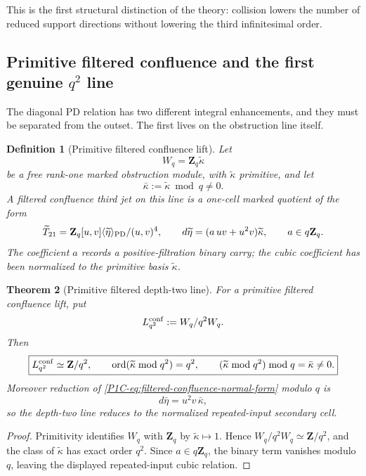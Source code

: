 \documentclass[11pt]{article}
\newtheorem{theorem}{Theorem}[section]
\newtheorem{definition}[theorem]{Definition}
\theoremstyle{remark}
\newcommand{\Z}{\mathbf Z}
\providecommand{\Ord}{\operatorname{Ord}}
\renewcommand{\Ord}{\operatorname{ord}}
\begin{document}
This is the first structural distinction of the theory: collision lowers the number of reduced support directions without lowering the third infinitesimal order.

\subsection{Primitive filtered confluence and the first genuine $q^2$ line}

The diagonal PD relation has two different integral enhancements, and they must be separated from the outset.  The first lives on the obstruction line itself.

\begin{definition}[Primitive filtered confluence lift]\label{P1C-def:filtered-confluence-lift}
Let
\[
 W_q=\Z_q\widetilde\kappa
\]
be a free rank-one marked obstruction module, with $\widetilde\kappa$ primitive, and let
\[
 \bar\kappa:=\widetilde\kappa\bmod q\ne0.
\]
A \emph{filtered confluence third jet} on this line is a one-cell marked quotient of the form
\begin{equation}\label{P1C-eq:filtered-confluence-normal-form}
 \widetilde T_{21}
 =
 \Z_q[u,v]\langle\widetilde\eta\rangle_{\rm PD}/(u,v)^4,
 \qquad
 d\widetilde\eta=(a\,uv+u^2v)\widetilde\kappa,
 \qquad a\in q\Z_q.
\end{equation}
The coefficient $a$ records a positive-filtration binary carry; the cubic coefficient has been normalized to the primitive basis $\widetilde\kappa$.
\end{definition}

\begin{theorem}[Primitive filtered depth-two line]\label{P1C-thm:filtered-q2-line}
For a primitive filtered confluence lift, put
\[
 L^{\rm conf}_{q^2}:=W_q/q^2W_q.
\]
Then
\[
 \boxed{
 L^{\rm conf}_{q^2}\simeq\Z/q^2,
 \qquad
 \Ord(\widetilde\kappa\bmod q^2)=q^2,
 \qquad
 (\widetilde\kappa\bmod q^2)\bmod q=\bar\kappa\ne0.}
\]
Moreover reduction of \eqref{P1C-eq:filtered-confluence-normal-form} modulo $q$ is
\[
 d\bar\eta=u^2v\,\bar\kappa,
\]
so the depth-two line reduces to the normalized repeated-input secondary cell.
\end{theorem}

\begin{proof}
Primitivity identifies $W_q$ with $\Z_q$ by $\widetilde\kappa\mapsto1$.  Hence
$W_q/q^2W_q\simeq\Z/q^2$, and the class of $\widetilde\kappa$ has exact order
$q^2$.  Since $a\in q\Z_q$, the binary term vanishes modulo $q$, leaving the
displayed repeated-input cubic relation.
\end{proof}
\end{document}
